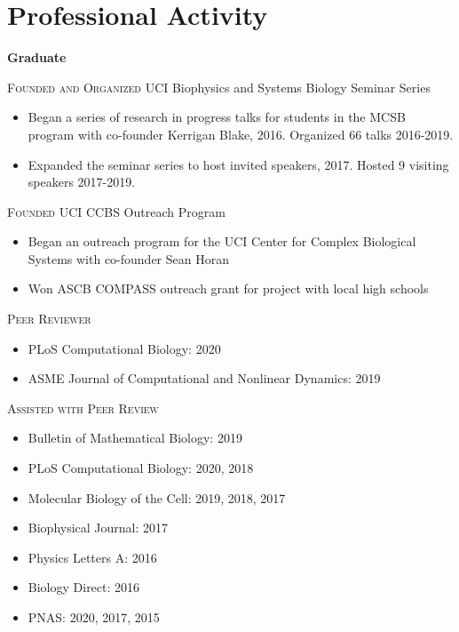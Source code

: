 \documentclass[letterpaper,10pt]{article} %
\begin{document}
\bigskip
\section*{Professional Activity}
\bigskip

{\large \textbf{Graduate}}

\textsc{Founded and Organized} UCI Biophysics and Systems Biology Seminar Series
\begin{itemize}
\item Began a series of research in progress talks for students in the MCSB program with co-founder Kerrigan Blake, 2016. Organized 66 talks 2016-2019.
\item Expanded the seminar series to host invited speakers, 2017. Hosted 9 visiting speakers 2017-2019.
\end{itemize}

\textsc{Founded} UCI CCBS Outreach Program
\begin{itemize}
\item Began an outreach program for the UCI Center for Complex Biological Systems with co-founder Sean Horan
\item Won ASCB COMPASS outreach grant for project with local high schools
\end{itemize}

\textsc{Peer Reviewer}
\begin{itemize}
\item PLoS Computational Biology: 2020
\item ASME Journal of Computational and Nonlinear Dynamics: 2019
\end{itemize}

\textsc{Assisted with Peer Review}
\begin{itemize}
\item Bulletin of Mathematical Biology: 2019
\item PLoS Computational Biology: 2020, 2018
\item Molecular Biology of the Cell: 2019, 2018, 2017
\item Biophysical Journal: 2017
\item Physics Letters A: 2016
\item Biology Direct: 2016
\item PNAS: 2020, 2017, 2015
\end{itemize}
\end{document}
